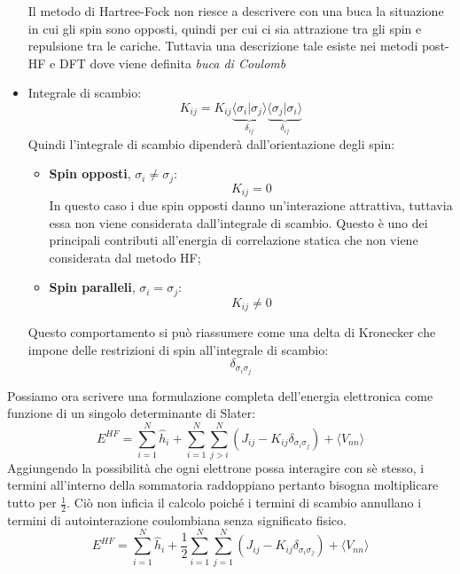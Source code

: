 \documentclass[oneside]{amsbook}
\numberwithin{section}{chapter}
\numberwithin{equation}{section}
\numberwithin{figure}{section}
\begin{document}
\begin{itemize}
Il metodo di Hartree-Fock non riesce a descrivere con una buca la situazione in cui gli spin sono opposti, quindi per cui ci sia attrazione tra gli spin e repulsione tra le cariche. Tuttavia una descrizione tale esiste nei metodi post-HF e DFT dove viene definita \emph{buca di Coulomb}
\item Integrale di scambio:
\begin{equation}
K_{ij}=K_{ij} \underbrace{\langle\sigma_i\vert\sigma_j\rangle}_{\delta_{ij} }\underbrace{\langle\sigma_j\vert\sigma_i\rangle}_{\delta_{ij}}
\end{equation}
Quindi l'integrale di scambio dipenderà dall'orientazione degli spin:
\begin{itemize}
\item \textbf{Spin opposti}, $\sigma_i\neq \sigma_j$: $$K_{ij}=0$$
In questo caso i due spin opposti danno un'interazione attrattiva, tuttavia essa non viene considerata dall'integrale di scambio. Questo è uno dei principali contributi all'energia di correlazione statica che non viene considerata dal metodo HF;
\item \textbf{Spin paralleli}, $\sigma_i= \sigma_j$: $$K_{ij}\neq 0$$
\end{itemize}
Questo comportamento si può riassumere come una delta di Kronecker che impone delle restrizioni di spin all'integrale di scambio:$$ \delta_{\sigma_i \sigma_j}$$
\end{itemize}
Possiamo ora scrivere una formulazione completa dell'energia elettronica come funzione di un singolo determinante di Slater:
\begin{equation}
E^{HF}=\sum \limits_{i=1} ^{N}  \hat{h}_{i} + \sum \limits_{i=1} ^{N} \sum \limits_{j>i} ^{N}  (J_{ij}-K_{ij}\delta_{\sigma_i \sigma_j})+\langle V_{nn}\rangle
\end{equation}
Aggiungendo la possibilità che ogni elettrone possa interagire con sè stesso, i termini all'interno della sommatoria raddoppiano pertanto bisogna moltiplicare tutto per $\frac{1}{2}$. Ciò non inficia il calcolo poiché i termini di scambio annullano i termini di autointerazione coulombiana senza significato fisico.
 \begin{equation}
E^{HF}=\sum \limits_{i=1} ^{N}  \hat{h}_{i} + \frac{1}{2} \sum \limits_{i=1} ^{N} \sum \limits_{j=1} ^{N}  (J_{ij}-K_{ij}\delta_{\sigma_i \sigma_j})+\langle V_{nn}\rangle
\end{equation}
\end{document}
